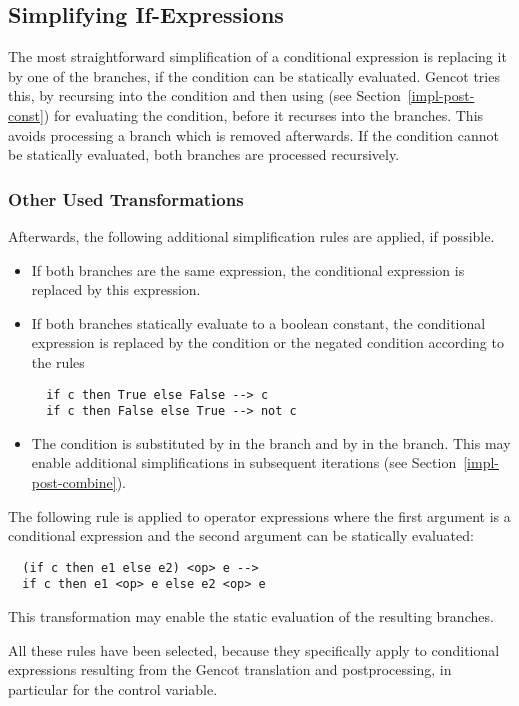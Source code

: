 \subsection{Simplifying If-Expressions}
\label{impl-post-if}

The most straightforward simplification of a conditional expression is replacing it by one of the branches, if the condition can be
statically evaluated. Gencot tries this, by recursing into the condition and then using  (see Section~\ref{impl-post-const})
for evaluating the condition, before it recurses into the branches. This avoids processing a branch which is removed afterwards. 
If the condition cannot be statically evaluated, both branches are processed recursively.

\subsubsection{Other Used Transformations}

Afterwards, the following additional simplification rules are applied, if possible.
\begin{itemize}
\item If both branches are the same expression, the conditional expression is replaced by this expression.
\item If both branches statically evaluate to a boolean constant, the conditional expression is replaced
by the condition or the negated condition according to the rules
\begin{verbatim}
  if c then True else False --> c
  if c then False else True --> not c
\end{verbatim}
\item The condition is substituted by  in the  branch and by  in the  branch. This 
may enable additional simplifications in subsequent iterations (see Section~\ref{impl-post-combine}).
\end{itemize}

The following rule is applied to operator expressions where the first argument is a conditional expression and the second argument
can be statically evaluated:
\begin{verbatim}
  (if c then e1 else e2) <op> e -->
  if c then e1 <op> e else e2 <op> e
\end{verbatim}
This transformation may enable the static evaluation of the resulting branches. 

All these rules have been selected, because they specifically apply to conditional expressions resulting from the Gencot translation
and postprocessing, in particular for the control variable.

